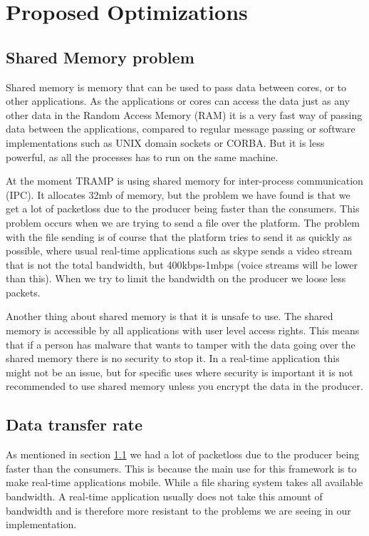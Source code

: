 \section{Proposed Optimizations}
\label{sec:optimizations}

\subsection{Shared Memory problem}
\label{smp}
Shared memory is memory that can be used to pass data between cores, or to other applications. As the applications or cores can access the data just as any other data in the Random Access Memory (RAM) it is a very fast way of passing data between the applications, compared to regular message passing or software implementations such as UNIX domain sockets or CORBA. But it is less powerful, as all the processes has to run on the same machine.\cite{shared_memory}

At the moment TRAMP is using shared memory for inter-process communication (IPC). It allocates 32mb of memory, but the problem we have found is that we get a lot of packetloss due to the producer being faster than the consumers. This problem occurs when we are trying to send a file over the platform. The problem with the file sending is of course that the platform tries to send it as quickly as possible, where usual real-time applications such as skype sends a video stream that is not the total bandwidth, but 400kbps-1mbps (voice streams will be lower than this). When we try to limit the bandwidth on the producer we loose less packets.

Another thing about shared memory is that it is unsafe to use. The shared memory is accessible by all applications with user level access rights. This means that if a person has malware that wants to tamper with the data going over the shared memory there is no security to stop it. In a real-time application this might not be an issue, but for specific uses where security is important it is not recommended to use shared memory unless you encrypt the data in the producer.

\subsection{Data transfer rate}
As mentioned in section \ref{smp} we had a lot of packetloss due to the producer being faster than the consumers. This is because the main use for this framework is to make real-time applications mobile. While a file sharing system takes all available bandwidth. A real-time application usually does not take this amount of bandwidth and is therefore more resistant to the problems we are seeing in our implementation.


